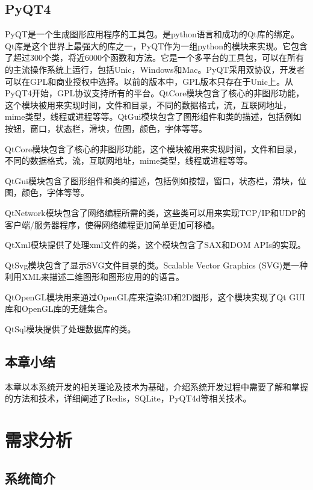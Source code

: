 \documentclass{zjutthesis}
\begin{document}
\section{PyQT4}
PyQT是一个生成图形应用程序的工具包。是python语言和成功的Qt库的绑定。Qt库是这个世界上最强大的库之一，PyQT作为一组python的模块来实现。它包含了超过300个类，将近6000个函数和方法。它是一个多平台的工具包，可以在所有的主流操作系统上运行，包括Unic，Windows和Mac。PyQT采用双协议，开发者可以在GPL和商业授权中选择。以前的版本中，GPL版本只存在于Unic上。从PyQT4开始，GPL协议支持所有的平台。QtCore模块包含了核心的非图形功能，这个模块被用来实现时间，文件和目录，不同的数据格式，流，互联网地址，mime类型，线程或进程等等。QtGui模块包含了图形组件和类的描述，包括例如按钮，窗口，状态栏，滑块，位图，颜色，字体等等。

QtCore模块包含了核心的非图形功能，这个模块被用来实现时间，文件和目录，不同的数据格式，流，互联网地址，mime类型，线程或进程等等。

QtGui模块包含了图形组件和类的描述，包括例如按钮，窗口，状态栏，滑块，位图，颜色，字体等等。

QtNetwork模块包含了网络编程所需的类，这些类可以用来实现TCP/IP和UDP的客户端/服务器程序，使得网络编程更加简单更加可移植。

QtXml模块提供了处理xml文件的类，这个模块包含了SAX和DOM APIs的实现。

QtSvg模块包含了显示SVG文件目录的类。Scalable Vector Graphics (SVG)是一种利用XML来描述二维图形和图形应用的的语言。

QtOpenGL模块用来通过OpenGL库来渲染3D和2D图形，这个模块实现了Qt GUI库和OpenGL库的无缝集合。

QtSql模块提供了处理数据库的类。

\section{本章小结}
本章以本系统开发的相关理论及技术为基础，介绍系统开发过程中需要了解和掌握的方法和技术，详细阐述了Redis，SQLite，PyQT4d等相关技术。


\chapter{需求分析}

\section{系统简介}
\end{document}
